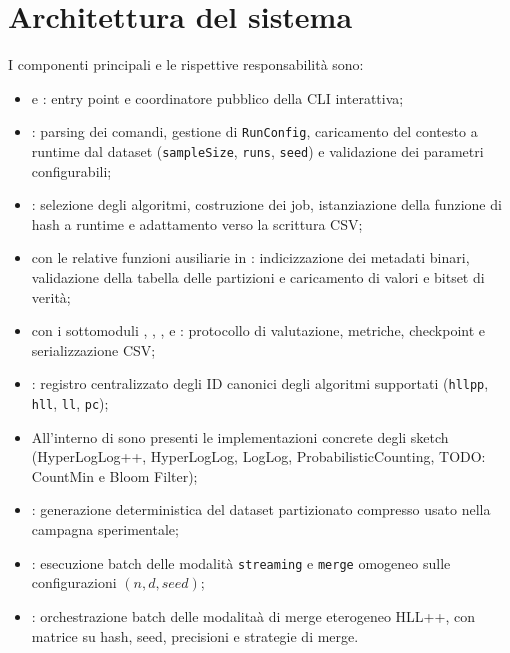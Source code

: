\section{Architettura del sistema}
I componenti principali e le rispettive responsabilità sono:
\begin{itemize}
    \item {} e : entry point e coordinatore pubblico
    della CLI interattiva;
    \item {}: parsing dei comandi, gestione di \texttt{RunConfig},
    caricamento del contesto a runtime dal dataset (\texttt{sampleSize}, \texttt{runs}, \texttt{seed})
    e validazione dei parametri configurabili;
    \item {}: selezione degli algoritmi, costruzione dei job,
    istanziazione della funzione di hash a runtime e adattamento verso la scrittura CSV;
    \item {} con le relative funzioni ausiliarie in
    : indicizzazione dei metadati binari,
    validazione della tabella delle partizioni e caricamento di valori e bitset di verità;
    \item {} con i sottomoduli
    , ,
    ,  e
    : protocollo di valutazione, metriche, checkpoint
    e serializzazione CSV;
    \item {}: registro centralizzato
    degli ID canonici degli algoritmi supportati (\texttt{hllpp}, \texttt{hll},
    \texttt{ll}, \texttt{pc});
    \item All'interno di  sono presenti le implementazioni concrete degli sketch
    (HyperLogLog++, HyperLogLog, LogLog, ProbabilisticCounting, TODO: CountMin e Bloom Filter);
    \item {}: generazione deterministica
    del dataset partizionato compresso usato nella campagna sperimentale;
    \item {}: esecuzione batch delle modalità
    \texttt{streaming} e \texttt{merge} omogeneo sulle configurazioni \((n,d,seed)\);
    \item {}: orchestrazione batch
    delle modalitaà di merge eterogeneo HLL++, con matrice su hash, seed,
    precisioni e strategie di merge.
\end{itemize}

